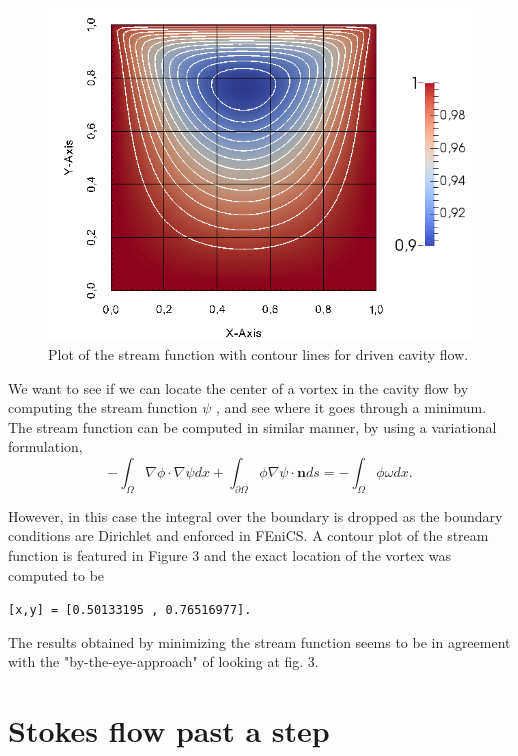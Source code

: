 \documentclass[11pt,a4paper,english]{article}
\numberwithin{equation}{section}
\begin{document}
\vspace{1.5cm}
\begin{figure}[h!]
\begin{center}
  \includegraphics[scale=0.5]{psi_square.png}
  \end{center}
  \caption{Plot of the stream function with contour lines for driven cavity flow.}
\end{figure}

We want to see if we can locate the center of a vortex in the cavity flow by computing the stream function $\psi$ , and see where it goes through a minimum. The stream function can be computed in similar manner, by using a variational formulation,  
\begin{equation}
-\int_\Omega \nabla \phi \cdot \nabla \psi dx + \int_{\partial \Omega} \phi \nabla \psi \cdot \mathbf{n} ds = - \int_\Omega \phi \omega dx.
\end{equation}

However, in this case the integral over the boundary is dropped as the boundary conditions are Dirichlet and enforced in FEniCS.
A contour plot of the stream function is featured in Figure 3 and the exact location of the vortex was computed to be 

\texttt{[x,y] =  [0.50133195 , 0.76516977].}

The results obtained by minimizing the stream function seems to be in agreement with the "by-the-eye-approach" of looking at fig. 3.  


\newpage
\section{Stokes flow past a step}
\end{document}
